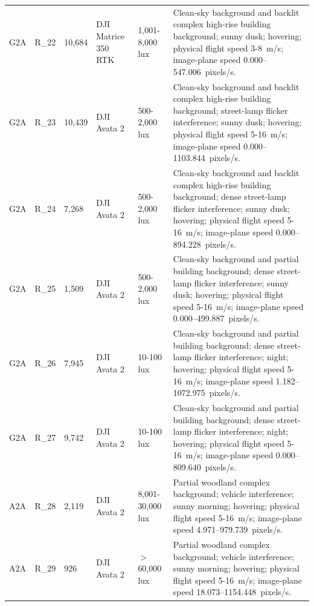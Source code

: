 \begin{longtable}{@{}C{0.045\textwidth} C{0.083\textwidth} C{0.075\textwidth} C{0.13\textwidth} C{0.15\textwidth} L{0.48\textwidth}@{}}
G2A & R\_22 & 10,684 & DJI Matrice 350 RTK & 1,001-8,000 lux & Clean-sky background and backlit complex high-rise building background; sunny dusk; hovering; physical flight speed 3-8~m/s; image-plane speed 0.000--547.006~pixels/s. \\

G2A & R\_23 & 10,439 & DJI Avata 2 & 500-2,000 lux & Clean-sky background and backlit complex high-rise building background; street-lamp flicker interference; sunny dusk; hovering; physical flight speed 5-16~m/s; image-plane speed 0.000--1103.844~pixels/s. \\

G2A & R\_24 & 7,268 & DJI Avata 2 & 500-2,000 lux & Clean-sky background and backlit complex high-rise building background; dense street-lamp flicker interference; sunny dusk; hovering; physical flight speed 5-16~m/s; image-plane speed 0.000--894.228~pixels/s. \\

G2A & R\_25 & 1,509 & DJI Avata 2 & 500-2,000 lux & Clean-sky background and partial building background; dense street-lamp flicker interference; sunny dusk; hovering; physical flight speed 5-16~m/s; image-plane speed 0.000--499.887~pixels/s. \\

G2A & R\_26 & 7,945 & DJI Avata 2 & 10-100 lux & Clean-sky background and partial building background; dense street-lamp flicker interference; night; hovering; physical flight speed 5-16~m/s; image-plane speed 1.182--1072.975~pixels/s. \\

G2A & R\_27 & 9,742 & DJI Avata 2 & 10-100 lux & Clean-sky background and partial building background; dense street-lamp flicker interference; night; hovering; physical flight speed 5-16~m/s; image-plane speed 0.000--809.640~pixels/s. \\

A2A & R\_28 & 2,119 & DJI Avata 2 & 8,001-30,000 lux & Partial woodland complex background; vehicle interference; sunny morning; hovering; physical flight speed 5-16~m/s; image-plane speed 4.971--979.739~pixels/s. \\

A2A & R\_29 & 926 & DJI Avata 2 & $>$60,000 lux & Partial woodland complex background; vehicle interference; sunny morning; hovering; physical flight speed 5-16~m/s; image-plane speed 18.073--1154.448~pixels/s. \\


\end{longtable}
